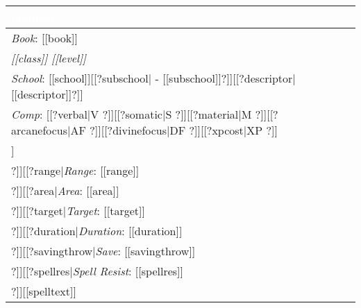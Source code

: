 \noindent
\begin{supertabular}{p{9cm}}
\vspace{1mm}\sf\Large\textbf{\textcolor{white}{[[name]]}} \\
\hline
\textit{Book}: [[book]] \\
\hline
\textit{[[class]] [[level]]}\\
\hline
\textit{School}: [[school]][[?subschool| - [[subschool]]?]][[?descriptor| [[descriptor]]?]]\\
\hline
\textit{Comp}: [[?verbal|V ?]][[?somatic|S ?]][[?material|M ?]][[?arcanefocus|AF ?]][[?divinefocus|DF ?]][[?xpcost|XP ?]]\\
\hline
[[?castingtime|\textit{Casting Time}: [[castingtime]] \\
\hline
?]][[?range|\textit{Range}: [[range]] \\
\hline
?]][[?area|\textit{Area}: [[area]] \\
\hline
?]][[?target|\textit{Target}: [[target]] \\
\hline
?]][[?duration|\textit{Duration}: [[duration]] \\
\hline
?]][[?savingthrow|\textit{Save}: [[savingthrow]] \\
\hline
?]][[?spellres|\textit{Spell Resist}: [[spellres]] \\
\hline
?]][[spelltext]]\\
\end{supertabular}

